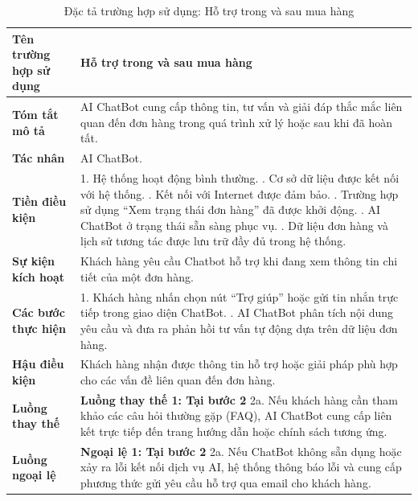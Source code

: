 \begin{longtable}{|>{\bfseries}p{4cm}|p{11.5cm}|}
\caption{Đặc tả trường hợp sử dụng: Hỗ trợ trong và sau mua hàng}
\label{tab:uc-post-purchase-support} \\
\hline
\textbf{Tên trường hợp sử dụng} & Hỗ trợ trong và sau mua hàng \\
\hline
\textbf{Tóm tắt mô tả} & AI ChatBot cung cấp thông tin, tư vấn và giải đáp thắc mắc liên quan đến đơn hàng trong quá trình xử lý hoặc sau khi đã hoàn tất. \\
\hline
\textbf{Tác nhân} & AI ChatBot. \\
\hline
\textbf{Tiền điều kiện} & 1. Hệ thống hoạt động bình thường. \newline
2. Cơ sở dữ liệu được kết nối với hệ thống. \newline
3. Kết nối với Internet được đảm bảo. \newline
4. Trường hợp sử dụng “Xem trạng thái đơn hàng” đã được khởi động. \newline
5. AI ChatBot ở trạng thái sẵn sàng phục vụ. \newline
6. Dữ liệu đơn hàng và lịch sử tương tác được lưu trữ đầy đủ trong hệ thống. \\
\hline
\textbf{Sự kiện kích hoạt} & Khách hàng yêu cầu Chatbot hỗ trợ khi đang xem thông tin chi tiết của một đơn hàng. \\
\hline
\textbf{Các bước thực hiện} & 1. Khách hàng nhấn chọn nút “Trợ giúp” hoặc gửi tin nhắn trực tiếp trong giao diện ChatBot. \newline
2. AI ChatBot phân tích nội dung yêu cầu và đưa ra phản hồi tư vấn tự động dựa trên dữ liệu đơn hàng. \\
\hline
\textbf{Hậu điều kiện} & Khách hàng nhận được thông tin hỗ trợ hoặc giải pháp phù hợp cho các vấn đề liên quan đến đơn hàng. \\
\hline
\textbf{Luồng thay thế} & \textbf{Luồng thay thế 1: Tại bước 2} \newline
2a. Nếu khách hàng cần tham khảo các câu hỏi thường gặp (FAQ), AI ChatBot cung cấp liên kết trực tiếp đến trang hướng dẫn hoặc chính sách tương ứng. \\
\hline
\textbf{Luồng ngoại lệ} & \textbf{Ngoại lệ 1: Tại bước 2} \newline
2a. Nếu ChatBot không sẵn dụng hoặc xảy ra lỗi kết nối dịch vụ AI, hệ thống thông báo lỗi và cung cấp phương thức gửi yêu cầu hỗ trợ qua email cho khách hàng. \\
\hline
\end{longtable}
